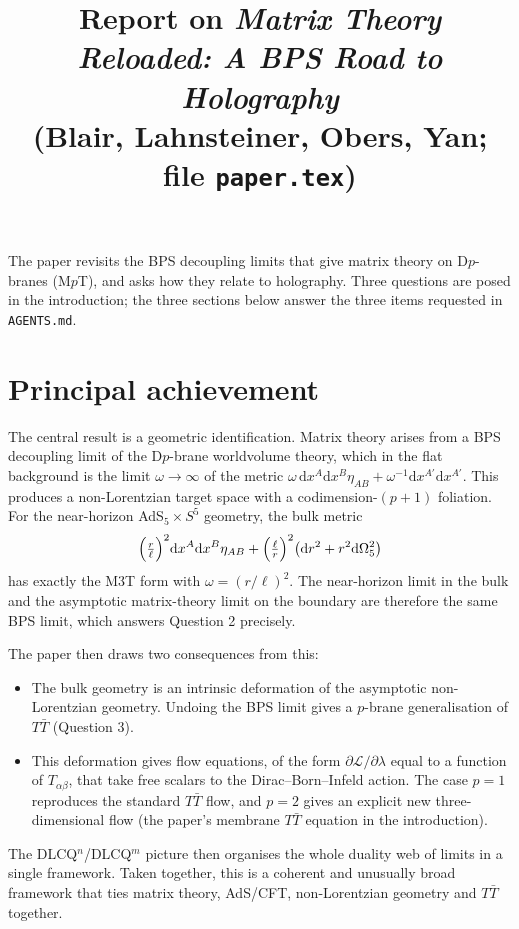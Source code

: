 \documentclass[11pt]{article}
\title{Report on \emph{Matrix Theory Reloaded: A BPS Road to Holography}\\[2pt]
\large (Blair, Lahnsteiner, Obers, Yan; file \texttt{paper.tex})}
\author{}
\date{}
\begin{document}
\maketitle

\noindent The paper revisits the BPS decoupling limits that give matrix theory on D$p$-branes (M$p$T), and asks how they relate to holography. Three questions are posed in the introduction; the three sections below answer the three items requested in \texttt{AGENTS.md}.

\section{Principal achievement}

The central result is a geometric identification. Matrix theory arises from a BPS decoupling limit of the D$p$-brane worldvolume theory, which in the flat background is the limit $\omega\to\infty$ of the metric $\omega\,\mathrm{d}x^A\mathrm{d}x^B\eta_{AB}+\omega^{-1}\mathrm{d}x^{A'}\mathrm{d}x^{A'}$. This produces a non-Lorentzian target space with a codimension-$(p+1)$ foliation. For the near-horizon AdS$_5\times S^5$ geometry, the bulk metric
\[
\Bigl(\tfrac{r}{\ell}\Bigr)^2\mathrm{d}x^A\mathrm{d}x^B\eta_{AB}+\Bigl(\tfrac{\ell}{r}\Bigr)^2\bigl(\mathrm{d}r^2+r^2\mathrm{d}\Omega_5^2\bigr)
\]
has exactly the M3T form with $\omega=(r/\ell)^2$. The near-horizon limit in the bulk and the asymptotic matrix-theory limit on the boundary are therefore the same BPS limit, which answers Question 2 precisely.

The paper then draws two consequences from this:
\begin{itemize}
\item The bulk geometry is an intrinsic deformation of the asymptotic non-Lorentzian geometry. Undoing the BPS limit gives a $p$-brane generalisation of $T\bar T$ (Question 3).
\item This deformation gives flow equations, of the form $\partial\mathcal L/\partial\lambda$ equal to a function of $T_{\alpha\beta}$, that take free scalars to the Dirac--Born--Infeld action. The case $p=1$ reproduces the standard $T\bar T$ flow, and $p=2$ gives an explicit new three-dimensional flow (the paper's membrane $T\bar T$ equation in the introduction).
\end{itemize}

The DLCQ$^n$/DLCQ$^m$ picture then organises the whole duality web of limits in a single framework. Taken together, this is a coherent and unusually broad framework that ties matrix theory, AdS/CFT, non-Lorentzian geometry and $T\bar T$ together.
\end{document}
